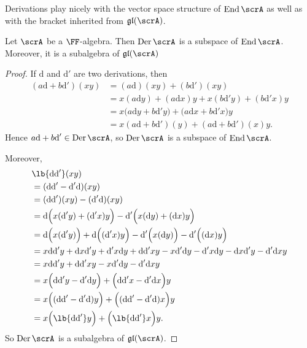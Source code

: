\documentclass{article}
\DeclarePairedDelimiter\lb\lbrack\rbrack
\DeclareMathOperator{\End}{End}
\DeclareMathOperator{\Der}{Der}
\newcommand{\dd}{\ensuremath{\text{d}}}
\newcommand*\gl{\ensuremath{\mathfrak{gl}}}
\begin{document}
Derivations play nicely with the vector space structure of $\End \scrA$ as well as with the bracket inherited from $\gl(\scrA)$.

\begin{proposition}
    Let $\scrA$ be a $\FF$-algebra.
    Then $\Der \scrA$ is a subspace of $\End \scrA$.
    Moreover, it is a subalgebra of $\gl(\scrA)$
\end{proposition}

\begin{proof}
    If $\dd$ and $\dd'$ are two derivations, then
    \begin{align*}
        (a\dd + b\dd')(xy)
        &=
        (a\dd)(xy) + (b\dd')(xy)
        \\
        &=
        x(a\dd y) + (a\dd x)y
        +
        x(b\dd'y) + (b\dd'x)y
        \\
        &=
        x
        \Big(
            a\dd y + b\dd'y
        \Big)
        +
        \Big(
            a\dd x + b\dd'x
        \Big)
        y
        \\
        &=
        x(a\dd + b\dd')(y)
        +
        (a\dd + b\dd')(x)y.
    \end{align*}
    Hence $a\dd + b\dd' \in \Der \scrA$, so $\Der \scrA$ is a subspace of $\End \scrA$.

    Moreover, 
    \begin{align*}
        &\lb{\dd\dd'}(xy)
        \\
        &=
        (\dd\dd' - \dd'\dd)(xy)
        \\
        &=
        (\dd\dd')(xy) - (\dd'\dd)(xy)
        \\
        &=
        \dd
        \Big(
            x(\dd'y) + (\dd'x)y
        \Big)
        -
        \dd'
        \Big(
            x(\dd y) + (\dd x)y
        \Big)
        \\
        &=
        \dd\Big(x(\dd'y)\Big) 
        +
        \dd\Big((\dd'x)y\Big) 
        -
        \dd'\Big(x(\dd y)\Big) 
        -
        \dd'\Big((\dd x)y\Big) 
        \\
        &=
        x\dd\dd'y
        +
        \dd x \dd' y
        +
        \dd'x \dd y
        +
        \dd\dd'x y
        -
        x\dd'\dd y
        -
        \dd' x \dd y
        -
        \dd x \dd' y
        -
        \dd' \dd x y
        \\
        &=
        x\dd\dd'y
        +
        \dd\dd'x y
        -
        x\dd'\dd y
        -
        \dd' \dd x y
        \\
        &=
        x
        \Big(
            \dd\dd'y - \dd'\dd y
        \Big)
        +
        \Big(
            \dd\dd'x - \dd'\dd x 
        \Big)
        y
        \\
        &=
        x\Big((\dd\dd' - \dd'\dd)y\Big)
        +
        \Big((\dd\dd' - \dd'\dd)x\Big)y
        \\
        &=
        x\Big(\lb{\dd\dd'}y\Big)
        +
        \Big(\lb{\dd\dd'}x\Big)y.
    \end{align*}
    So $\Der \scrA$ is a subalgebra of $\gl(\scrA)$.
\end{proof}
\end{document}
